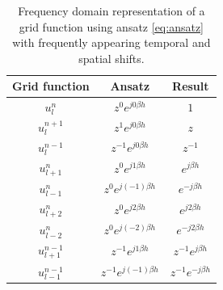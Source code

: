 {\renewcommand{\arraystretch}{1.2}

\begin{table}[h]
    \begin{center}
    \begin{tabular}{|c|c|c|}
        \hline
        Grid function & Ansatz & Result\\ \hline
        $u_l^n$ & $z^0 e^{j0\beta h}$ & $1$\\
        $u_l^{n+1}$ & $z^1 e^{j0\beta h}$ & $z$\\
        $u_l^{n-1}$ & $z^{-1} e^{j0\beta h}$ & $z^{-1}$\\
        $u_{l+1}^n$ & $z^0 e^{j1\beta h}$ & $e^{j\beta h}$\\
        $u_{l-1}^n$ & $z^0 e^{j(-1)\beta h}$ & $e^{-j\beta h}$\\
        $u_{l+2}^n$ & $z^0 e^{j2\beta h}$ & $e^{j2\beta h}$\\
        $u_{l-2}^n$ & $z^0 e^{j(-2)\beta h}$ & $e^{-j2\beta h}$\\
        $u_{l+1}^{n-1}$ & $z^{-1} e^{j1\beta h}$ & $z^{-1}e^{j\beta h}$\\
        $u_{l-1}^{n-1}$ & $z^{-1} e^{j(-1)\beta h}$ & $z^{-1}e^{-j\beta h}$\\\hline
    \end{tabular}
    \caption{Frequency domain representation of a grid function using ansatz \eqref{eq:ansatz} with frequently appearing temporal and spatial shifts.\label{tab:zIdentities}}
    \end{center}
\end{table}
{\renewcommand{\arraystretch}{1}

}}
